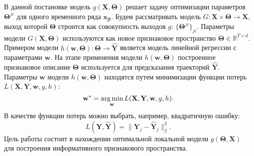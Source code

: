 \documentclass[12pt,twoside]{article}
\begin{document}
В данной постановке модель $g(\mathbf{X}, \mathbf{\Theta})$ решает задачу оптимизации параметров $\mathbf{\Theta}^{ji}$ для одного временного ряда $\mathbf{x_{ji}}$. Будем рассматривать модель $G: \mathbf{X}\times\mathbf{\Theta}\to\mathbf{X}$, выход которой $\mathbf{\Theta}$ строится как совокупность выходов $g$: $\{\mathbf{\Theta}^{ji}\}_{ji}$. Параметры модели $G(\mathbf{X}, \mathbf{\Theta})$ используются как новое признаковое пространство $\mathbf{\Theta}\in\mathbb{R}^{T\times d}$.
Примером модели $h(\mathbf{w}, \mathbf{\Theta}): \mathbf{\Theta}\to\mathbf{\hat{Y}}$ является модель линейной регрессии с параметрами $\mathbf{w}$. На этапе применения модели $h(\mathbf{w}, \mathbf{\Theta})$ построенное признаковое описание $\mathbf{\Theta}$ используется для предсказания траекторий $\mathbf{\hat{Y}}$.
Параметры $\mathbf{w}$ модели $h(\mathbf{w}, \mathbf{\Theta})$ находятся путем минимизации функции потерь $L(\mathbf{X}, \mathbf{Y}, \mathbf{w}, g, h)$:
\begin{equation}
\mathbf{w^*} = \argmin_{\mathbf{w}} L(\mathbf{X}, \mathbf{Y}, \mathbf{w}, g, h).
\end{equation}
В качестве функции потерь можно выбрать, например, квадратичную ошибку:
\begin{equation}
L(\mathbf{Y}, \mathbf{\hat{Y}}) = \|\mathbf{Y}_j-\mathbf{\hat{Y}}_j\|^2_2.
\end{equation}
Цель работы состоит в нахождении оптимальной локальной модели $g(\mathbf{\Theta}, \mathbf{X})$ для построения информативного признакового пространства.


\end{document}
